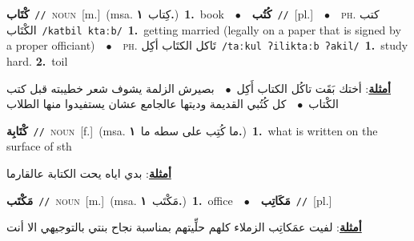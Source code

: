 \documentclass[10pt,a4paper,twoside]{article} %
\begin{document}
\begin{multicols}{2}
{\setlength\topsep{0pt}\textbf{\foreignlanguage{arabic}{كْتَاب}}\ {\color{gray}\texttt{//}\color{black}}\ \textsc{noun}\ [m.]\ \color{gray}(msa. \foreignlanguage{arabic}{كِتاب}~\foreignlanguage{arabic}{\textbf{١.}})\color{black}\ \textbf{1.}~book\ \ $\bullet$\ \ \setlength\topsep{0pt}\textbf{\foreignlanguage{arabic}{كُتُب}}\ {\color{gray}\texttt{//}\color{black}}\ [pl.]\ \ $\bullet$\ \ \textsc{ph.} \color{gray} \foreignlanguage{arabic}{كتب الكْتَاب}\color{black}\ {\color{gray}\texttt{/{\sffamily katbil ktaːb}/}\color{black}}\ \textbf{1.}~getting married (legally on a paper that is signed by a proper officiant)\ \ $\bullet$\ \ \textsc{ph.} \color{gray} \foreignlanguage{arabic}{تَاكل الكتَاب أكِل}\color{black}\ {\color{gray}\texttt{/{\sffamily taːkul ʔiliktaːb ʔakil}/}\color{black}}\ \textbf{1.}~study hard.  \textbf{2.}~toil\  \begin{flushright}\color{gray}\foreignlanguage{arabic}{\textbf{\underline{\foreignlanguage{arabic}{أمثلة}}}: أختك بَقَت تاكُل الكتاب أَكِل\ $\bullet$\ \  بصيرش الزلمة يشوف شعر خطيبته قبل كتب الكْتاب\ $\bullet$\ \  كل كُتُبي القديمة وديتها عالجامع عشان يستفيدوا منها الطلاب}\end{flushright}\color{black}} \vspace{2mm}

{\setlength\topsep{0pt}\textbf{\foreignlanguage{arabic}{كْتَابِة}}\ {\color{gray}\texttt{//}\color{black}}\ \textsc{noun}\ [f.]\ \color{gray}(msa. \foreignlanguage{arabic}{ما كُتِب على سطه ما}~\foreignlanguage{arabic}{\textbf{١.}})\color{black}\ \textbf{1.}~what is written on the surface of sth\  \begin{flushright}\color{gray}\foreignlanguage{arabic}{\textbf{\underline{\foreignlanguage{arabic}{أمثلة}}}: بدي اياه  يحت الكتابة عالقارما}\end{flushright}\color{black}} \vspace{2mm}

{\setlength\topsep{0pt}\textbf{\foreignlanguage{arabic}{مَكْتَب}}\ {\color{gray}\texttt{//}\color{black}}\ \textsc{noun}\ [m.]\ \color{gray}(msa. \foreignlanguage{arabic}{مَكْتَب}~\foreignlanguage{arabic}{\textbf{١.}})\color{black}\ \textbf{1.}~office\ \ $\bullet$\ \ \setlength\topsep{0pt}\textbf{\foreignlanguage{arabic}{مَكَاتِب}}\ {\color{gray}\texttt{//}\color{black}}\ [pl.]\  \begin{flushright}\color{gray}\foreignlanguage{arabic}{\textbf{\underline{\foreignlanguage{arabic}{أمثلة}}}: لفيت عمَكاتِب الزملاء كلهم حلِّيتهم بمناسبة نجاح بنتي بالتوجيهي الا أنت}\end{flushright}\color{black}} \vspace{2mm}


\end{multicols}
\end{document}
